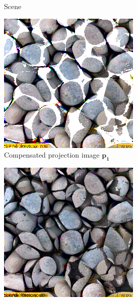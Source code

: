 \begin{figure}[ht]
\begin{subfigure}{\textwidth}
\begin{subfigure}{0.2\textwidth}
            \caption*{Scene}
            \vspace*{10mm}
            \label{fig:intro_pixels_vs_stats-pixels_bg}
        \end{subfigure}
        \hfill
        \begin{subfigure}{0.2\textwidth}
            \centering
            \includegraphics[width=\textwidth]{images/01-pixels_vs_stats-pixels_opt.jpg}
            \caption*{Compensated projection image \(\bm{p_1}\)}
            \label{fig:intro_pixels_vs_stats-pixels_opt}
        \end{subfigure}
        \hfill
        \begin{subfigure}{0.2\textwidth}
            \centering
            \includegraphics[width=\textwidth]{images/01-pixels_vs_stats-pixels_proj.jpg}

\end{subfigure}
\end{subfigure}
\end{figure}
